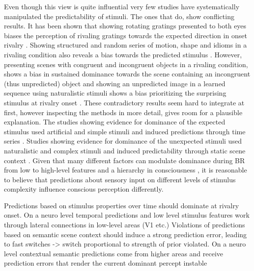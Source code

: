 \documentclass[]{article}
\begin{document}
Even though this view is quite influential very few studies have systematically manipulated the predictability of stimuli. The ones that do, show conflicting results. It has been shown that showing rotating gratings presented to both eyes biases the perception of rivaling gratings towards the expected direction in onset rivalry \parencite{denisonPredictiveContextInfluences2011, attarhaOnsetRivalryFactors2015}. Showing structured and random series of motion, shape and idioms in a rivaling condition also reveals a bias towards the predicted stimulus \parencite{huVisualTemporalIntegration2021}.
However, presenting scenes with congruent and incongruent objects in a rivaling condition, shows a bias in sustained dominance towards the scene containing an incongruent (thus unpredicted) object \parencite{mudrikSceneCongruencyBiases2011,zachariaDoesValenceInfluence2020} and showing an unpredicted image in a learned sequence using naturalistic stimuli shows a bias prioritizing the surprising stimulus at rivalry onset \parencite{denisonPerceptualSuppressionPredicted2016}.
These contradictory results seem hard to integrate at first, however inspecting the methods in more detail, gives room for a plausible explanation.
The studies showing evidence for dominance of the expected stimulus used artificial and simple stimuli and induced predictions through time series \parencite{denisonPredictiveContextInfluences2011,attarhaOnsetRivalryFactors2015,huVisualTemporalIntegration2021}. Studies showing evidence for dominance of the unexpected stimuli used naturalistic and complex stimuli and induced predictability through static scene context \parencite{mudrikSceneCongruencyBiases2011,zachariaDoesValenceInfluence2020}. 
Given that many different factors can modulate dominance during BR from low \parencite{brascampLawsBinocularRivalry2015} to high-level features \parencite{safaviMultistabilityPerceptualValue2022} and a hierarchy in consciousness \parencite{zekiDisunityConsciousness2003}, it is reasonable to believe that predictions about sensory input on different levels of stimulus complexity influence conscious perception differently.\par
Predictions based on stimulus properties over time should dominate at rivalry onset. On a neuro level temporal predictions and low level stimulus features work through lateral connections in low-level areas (V1 etc.)
Violations of predictions based on semantic scene context should induce a strong prediction error, leading to fast switches -> switch proportional to strength of prior violated.
On a neuro level contextual semantic predictions come from higher areas and receive prediction errors that render the current dominant percept instable
\end{document}
